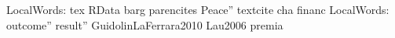 
LocalWords:  tex RData barg parencites Peace'' textcite cha financ
LocalWords:  outcome'' result'' GuidolinLaFerrara2010 Lau2006 premia
